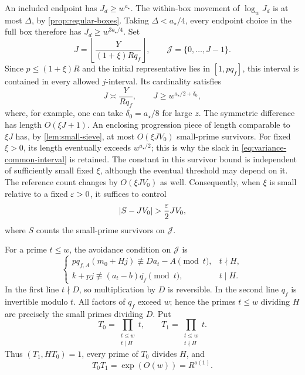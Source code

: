 An included endpoint has \(J_d\ge w^{a_\star}\). The within-box movement
of \(\log_w J_d\) is at most \(\Delta\), by
\cref{prop:regular-boxes}. Taking \(\Delta<a_\star/4\), every endpoint
choice in the full box therefore has \(J_d\ge w^{3a_\star/4}\).
Set
\[
 J=\left\lfloor\frac{Y}{(1+\xi)Rq_f}\right\rfloor,
 \qquad \mathcal J=\{0,\ldots,J-1\}.
\]
Since \(p\le(1+\xi)R\) and the initial representative lies in
\([1,pq_f]\), this interval is contained in every allowed
\(j\)-interval. Its cardinality satisfies
\begin{equation}\label{eq:variance-common-interval}
 J\asymp \frac{Y}{Rq_f},
 \qquad J\ge w^{a_\star/2+\delta_0},
\end{equation}
where, for example, one can take \(\delta_0=a_\star/8\) for large \(z\).
The symmetric difference has length \(O(\xi J+1)\).
An enclosing progression piece of length comparable to \(\xi J\) has,
by \cref{lem:small-sieve}, at most \(O(\xi JV_0)\) small-prime survivors.
For fixed \(\xi>0\), its length eventually exceeds \(w^{a_\star/2}\);
this is why the slack in \eqref{eq:variance-common-interval} is retained.
The constant in this survivor bound is independent of sufficiently small
fixed \(\xi\), although the eventual threshold may depend on it.
The reference count changes by \(O(\xi JV_0)\) as well.
Consequently, when \(\xi\) is small relative to a fixed \(\varepsilon>0\), it
suffices to control
\begin{equation}\label{eq:variance-bad-common}
 \left|S-JV_0\right|>\frac{\eps}{2}JV_0,
\end{equation}
where \(S\) counts the small-prime survivors on \(\mathcal J\).

For a prime \(t\le w\), the avoidance condition on \(\mathcal J\) is
\begin{equation}\label{eq:variance-avoidance}
 \begin{cases}
 pq_{f,A}(m_0+Hj)\not\equiv Da_t-A\pmod t,&t\nmid H,\\
 k+pj\not\equiv(a_t-b)\overline{q_f}\pmod t,&t\mid H.
 \end{cases}
\end{equation}
In the first line \(t\nmid D\), so multiplication by \(D\) is reversible.
In the second line \(q_f\) is invertible modulo \(t\).
All factors of \(q_f\) exceed \(w\); hence the primes \(t\le w\) dividing
\(H\) are precisely the small primes dividing \(D\).
Put
\begin{equation}\label{eq:variance-small-products}
 T_0=\prod_{\substack{t\le w\\t\mid H}}t,
 \qquad
 T_1=\prod_{\substack{t\le w\\t\nmid H}}t.
\end{equation}
Thus \((T_1,HT_0)=1\), every prime of \(T_0\) divides \(H\), and
\begin{equation}\label{eq:variance-pattern-size}
 T_0T_1=\exp(O(w))=R^{o(1)}.
\end{equation}

